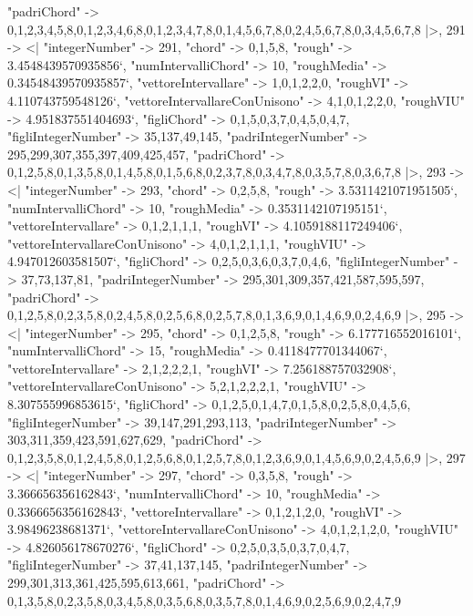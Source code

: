 \documentclass[
]{article}
\begin{document}
\begin{DatasetVerbatim}
    "padriChord" -> {{0,1,2,3,4,5,8},{0,1,2,3,4,6,8},{0,1,2,3,4,7,8},{0,1,4,5,6,7,8},{0,2,4,5,6,7,8},{0,3,4,5,6,7,8}}
  |>,
  291 -> <|
    "integerNumber" -> 291,
    "chord" -> {0,1,5,8},
    "rough" -> 3.4548439570935856`,
    "numIntervalliChord" -> 10,
    "roughMedia" -> 0.34548439570935857`,
    "vettoreIntervallare" -> {1,0,1,2,2,0},
    "roughVI" -> 4.110743759548126`,
    "vettoreIntervallareConUnisono" -> {4,1,0,1,2,2,0},
    "roughVIU" -> 4.951837551404693`,
    "figliChord" -> {{0,1,5},{0,3,7},{0,4,5},{0,4,7}},
    "figliIntegerNumber" -> {35,137,49,145},
    "padriIntegerNumber" -> {295,299,307,355,397,409,425,457},
    "padriChord" -> {{0,1,2,5,8},{0,1,3,5,8},{0,1,4,5,8},{0,1,5,6,8},{0,2,3,7,8},{0,3,4,7,8},{0,3,5,7,8},{0,3,6,7,8}}
  |>,
  293 -> <|
    "integerNumber" -> 293,
    "chord" -> {0,2,5,8},
    "rough" -> 3.5311421071951505`,
    "numIntervalliChord" -> 10,
    "roughMedia" -> 0.3531142107195151`,
    "vettoreIntervallare" -> {0,1,2,1,1,1},
    "roughVI" -> 4.1059188117249406`,
    "vettoreIntervallareConUnisono" -> {4,0,1,2,1,1,1},
    "roughVIU" -> 4.947012603581507`,
    "figliChord" -> {{0,2,5},{0,3,6},{0,3,7},{0,4,6}},
    "figliIntegerNumber" -> {37,73,137,81},
    "padriIntegerNumber" -> {295,301,309,357,421,587,595,597},
    "padriChord" -> {{0,1,2,5,8},{0,2,3,5,8},{0,2,4,5,8},{0,2,5,6,8},{0,2,5,7,8},{0,1,3,6,9},{0,1,4,6,9},{0,2,4,6,9}}
  |>,
  295 -> <|
    "integerNumber" -> 295,
    "chord" -> {0,1,2,5,8},
    "rough" -> 6.177716552016101`,
    "numIntervalliChord" -> 15,
    "roughMedia" -> 0.4118477701344067`,
    "vettoreIntervallare" -> {2,1,2,2,2,1},
    "roughVI" -> 7.256188757032908`,
    "vettoreIntervallareConUnisono" -> {5,2,1,2,2,2,1},
    "roughVIU" -> 8.307555996853615`,
    "figliChord" -> {{0,1,2,5},{0,1,4,7},{0,1,5,8},{0,2,5,8},{0,4,5,6}},
    "figliIntegerNumber" -> {39,147,291,293,113},
    "padriIntegerNumber" -> {303,311,359,423,591,627,629},
    "padriChord" -> {{0,1,2,3,5,8},{0,1,2,4,5,8},{0,1,2,5,6,8},{0,1,2,5,7,8},{0,1,2,3,6,9},{0,1,4,5,6,9},{0,2,4,5,6,9}}
  |>,
  297 -> <|
    "integerNumber" -> 297,
    "chord" -> {0,3,5,8},
    "rough" -> 3.366656356162843`,
    "numIntervalliChord" -> 10,
    "roughMedia" -> 0.3366656356162843`,
    "vettoreIntervallare" -> {0,1,2,1,2,0},
    "roughVI" -> 3.98496238681371`,
    "vettoreIntervallareConUnisono" -> {4,0,1,2,1,2,0},
    "roughVIU" -> 4.826056178670276`,
    "figliChord" -> {{0,2,5},{0,3,5},{0,3,7},{0,4,7}},
    "figliIntegerNumber" -> {37,41,137,145},
    "padriIntegerNumber" -> {299,301,313,361,425,595,613,661},
    "padriChord" -> {{0,1,3,5,8},{0,2,3,5,8},{0,3,4,5,8},{0,3,5,6,8},{0,3,5,7,8},{0,1,4,6,9},{0,2,5,6,9},{0,2,4,7,9}}

\end{DatasetVerbatim}
\end{document}

